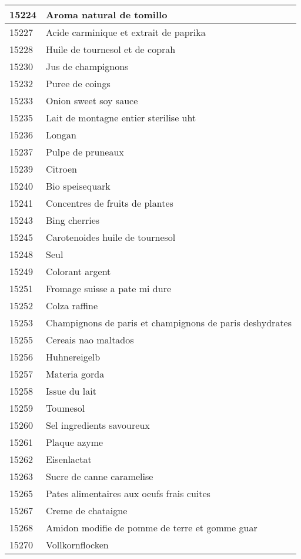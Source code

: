 \begin{longtable}{|l|l|}
15224 & Aroma natural de tomillo \\ \hline 
15227 & Acide carminique et extrait de paprika \\ \hline 
15228 & Huile de tournesol et de coprah \\ \hline 
15230 & Jus de champignons \\ \hline 
15232 & Puree de coings \\ \hline 
15233 & Onion sweet soy sauce \\ \hline 
15235 & Lait de montagne entier sterilise uht \\ \hline 
15236 & Longan \\ \hline 
15237 & Pulpe de pruneaux \\ \hline 
15239 & Citroen \\ \hline 
15240 & Bio speisequark \\ \hline 
15241 & Concentres de fruits de plantes \\ \hline 
15243 & Bing cherries \\ \hline 
15245 & Carotenoides huile de tournesol \\ \hline 
15248 & Seul \\ \hline 
15249 & Colorant argent \\ \hline 
15251 & Fromage suisse a pate mi dure \\ \hline 
15252 & Colza raffine \\ \hline 
15253 & Champignons de paris et champignons de paris deshydrates \\ \hline 
15255 & Cereais nao maltados \\ \hline 
15256 & Huhnereigelb \\ \hline 
15257 & Materia gorda \\ \hline 
15258 & Issue du lait \\ \hline 
15259 & Toumesol \\ \hline 
15260 & Sel ingredients savoureux \\ \hline 
15261 & Plaque azyme \\ \hline 
15262 & Eisenlactat \\ \hline 
15263 & Sucre de canne caramelise \\ \hline 
15265 & Pates alimentaires aux oeufs frais cuites \\ \hline 
15267 & Creme de chataigne \\ \hline 
15268 & Amidon modifie de pomme de terre et gomme guar \\ \hline 
15270 & Vollkornflocken \\ \hline 

\end{longtable}
